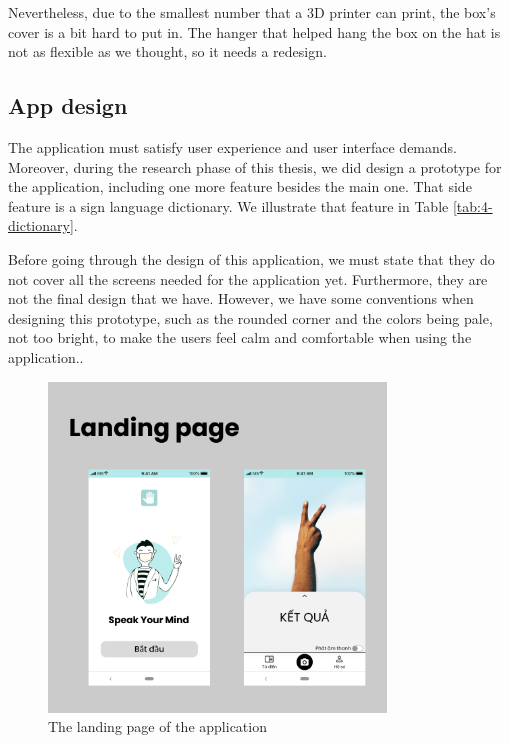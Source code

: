 Nevertheless, due to the smallest number that a 3D printer can print, the box's cover is a bit hard to put in. The hanger that helped hang the box on the hat is not as flexible as we thought, so it needs a redesign.

\subsection{App design}

The application must satisfy user experience and user interface demands. Moreover, during the research phase of this thesis, we did design a prototype for the application, including one more feature besides the main one. That side feature is a sign language dictionary. We illustrate that feature in Table \ref{tab:4-dictionary}.

Before going through the design of this application, we must state that they do not cover all the screens needed for the application yet. Furthermore, they are not the final design that we have. However, we have some conventions when designing this prototype, such as the rounded corner and the colors being pale, not too bright, to make the users feel calm and comfortable when using the application..

\begin{figure}[H]
	\centering
	\includegraphics[width=0.8\textwidth]{img/Chap5/Landing_page.png}
	\caption{The landing page of the application}
\end{figure}

